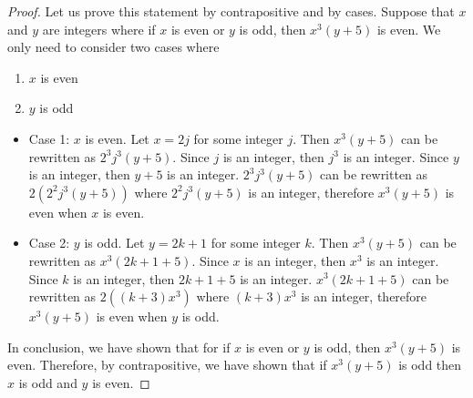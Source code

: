 \documentclass{report}
\theoremstyle{mytheoremstyle}
\theoremstyle{mytheoremstyle}
\theoremstyle{myproblemstyle}
\begin{document}
\begin{proof}
Let us prove this statement by contrapositive and by cases. Suppose that $x$ and $y$ are integers where if $x$ is even or $y$ is odd, then $x^3(y+5)$ is even. We only need to consider two cases where
\begin{enumerate}
    \item $x$ is even
    \item $y$ is odd
\end{enumerate}
\begin{itemize}
    \item Case 1: $x$ is even. Let $x=2j$ for some integer $j$. Then $x^3(y+5)$ can be rewritten as $2^3j^3(y+5)$. Since $j$ is an integer, then $j^3$ is an integer. Since $y$ is an integer, then $y+5$ is an integer. $2^3j^3(y+5)$ can be rewritten as $2(2^2j^3(y+5))$ where $2^2j^3(y+5)$ is an integer, therefore $x^3(y+5)$ is even when $x$ is even.
    \item Case 2: $y$ is odd. Let $y=2k+1$ for some integer $k$. Then $x^3(y+5)$ can be rewritten as $x^3(2k+1+5)$. Since $x$ is an integer, then $x^3$ is an integer. Since $k$ is an integer, then $2k+1+5$ is an integer. $x^3(2k+1+5)$ can be rewritten as $2((k+3)x^3)$ where $(k+3)x^3$ is an integer, therefore $x^3(y+5)$ is even when $y$ is odd.
\end{itemize}
In conclusion, we have shown that for if $x$ is even or $y$ is odd, then $x^3(y+5)$ is even. Therefore, by contrapositive, we have shown that if $x^3(y+5)$ is odd then $x$ is odd and $y$ is even.
\end{proof}
\end{document}

